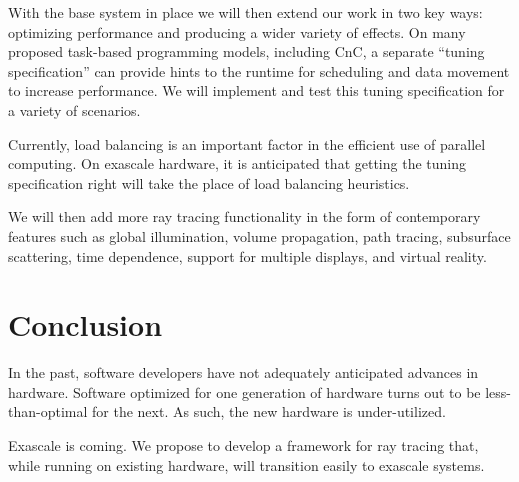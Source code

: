 \documentclass[12pt]{article}
\begin{document}
With the base system in place we will then extend our work in two key
ways: optimizing performance and producing a wider variety of effects.
On many proposed task-based programming models, including CnC, a
separate ``tuning specification'' can provide hints to the runtime for
scheduling and data movement to increase performance. We will
implement and test this tuning specification for a variety of
scenarios.

Currently, load balancing is an important factor in the efficient use
of parallel computing. On exascale hardware, it is anticipated that
getting the tuning specification right will take the place of load
balancing heuristics.

We will then add more ray tracing functionality in the form of
contemporary features such as global illumination, volume propagation,
path tracing, subsurface scattering, time dependence, support for
multiple displays, and virtual reality.

\section*{Conclusion}

In the past, software developers have not adequately anticipated
advances in hardware. Software optimized for one generation of
hardware turns out to be less-than-optimal for the next. As such, the
new hardware is under-utilized.

Exascale is coming. We propose to develop a framework for ray tracing
that, while running on existing hardware, will transition easily to
exascale systems.
\end{document}
